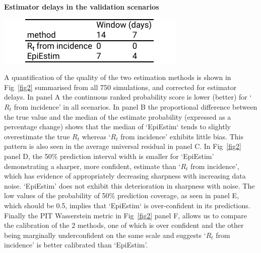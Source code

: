 \documentclass[10pt,letterpaper]{article}
\begin{document}
\begin{table}[!ht]
\caption{{\bf Estimator delays in the validation scenarios}}
\centerline{\includegraphics{fig/tab1-lags}}
\label{tab1}
\end{table}

A quantification of the quality of the two estimation methods is shown in Fig~\ref{fig2} summarised from all 750 simulations, and corrected for estimator delays. In panel A the continuous ranked probability score is lower (better) for `$R_t$ from incidence' in all scenarios. In panel B the proportional difference between the true value and the median of the estimate probability (expressed as a percentage change) shows that the median of `EpiEstim` tends to slightly overestimate the true $R_t$ whereas `$R_t$ from incidence' exhibits little bias. This pattern is also seen in the average universal residual in panel C. In Fig~\ref{fig2} panel D, the 50\% prediction interval width is smaller for `EpiEstim' demonstrating a sharper, more confident, estimate than `$R_t$ from incidence', which has evidence of appropriately decreasing sharpness with increasing data noise. `EpiEstim' does not exhibit this deterioration in sharpness with noise. The low values of the probability of 50\% prediction coverage, as seen in panel E, which should be 0.5, implies that `EpiEstim` is over-confident in its predictions. Finally the PIT Wasserstein metric in Fig~\ref{fig2} panel F, allows us to compare the calibration of the 2 methods, one of which is over confident and the other being marginally underconfident on the same scale and suggests `$R_t$ from incidence' is better calibrated than `EpiEstim'.
\end{document}
